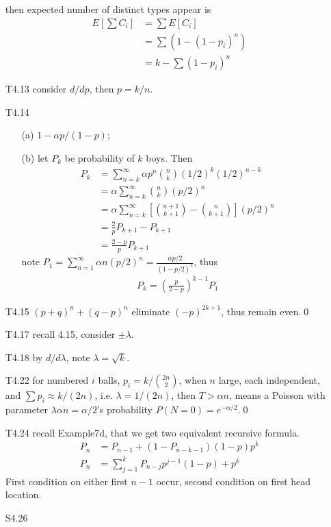 \documentclass[paper=a4, fontsize=11pt]{scrartcl} %
\numberwithin{equation}{section} %
\numberwithin{figure}{section} %
\numberwithin{table}{section} %
\begin{document}
\begin{itemize}
	then expected number of distinct types appear is
	\begin{align}
		E[\sum C_i] &= \sum E[C_i] \\
			&= \sum (1 - (1-p_i)^n) \\
			&= k - \sum (1-p_i)^n
	\end{align}
	\item[T4.13] consider $d/dp$, then $p=k/n$.
	\item[T4.14]
	\begin{itemize}
		\item[(a)] $1 - \alpha p/(1-p)$;
		\item[(b)] let $P_k$ be probability of $k$ boys. Then
		\begin{align}
			P_k &= \sum_{n=k}^\infty \alpha p^n {n\choose k} (1/2)^{k}(1/2)^{n-k}\\
				&= \alpha \sum_{n=k}^\infty{n\choose k}(p/2)^n \\
				&= \alpha \sum_{n=k}^\infty [{n+1\choose k+1} -{n\choose k+1}](p/2)^n \\
				&= \frac{2}{p} P_{k+1}  -  P_{k+1}\\
				&= \frac{2-p}{p} P_{k+1}
		\end{align}
		note $P_1 = \sum_{n=1}^\infty \alpha n(p/2)^n =  \frac{\alpha p/2}{(1-p/2)^2}$, thus
		\begin{align}
			P_k = (\frac{p}{2-p})^{k-1} P_1
		\end{align}
	\end{itemize}
	\item[T4.15] $(p+q)^n+(q-p)^n$ eliminate $(-p)^{2k+1}$, thus remain even.\qed
	\item[T4.17] recall 4.15, consider $\pm\lambda$.
	\item[T4.18] by $d/d\lambda$, note $\lambda = \sqrt{k}$.
	\item[T4.22] for numbered $i$ balls, $p_i = k/{2n\choose 2}$, when $n$ large, each independent, and $\sum p_i \approx k/(2n)$, i.e. $\lambda =1/(2n)$, then $T>\alpha n$, means a Poisson with parameter $\lambda \alpha n = \alpha/2$'s probability $P(N=0) = e^{-\alpha/2}$.\qed
	\item[T4.24] recall Example7d, that we get two equivalent recursive formula.
	\begin{align}
		P_n &= P_{n-1} + (1-P_{n-k-1})(1-p)p^k \\
		P_n &= \sum_{j=1}^k P_{n-j}p^{j-1}(1-p) + p^k
	\end{align}
	First condition on either first $n-1$ occur, second condition on first head location.
	\item[S4.26]

\end{itemize}
\end{document}
